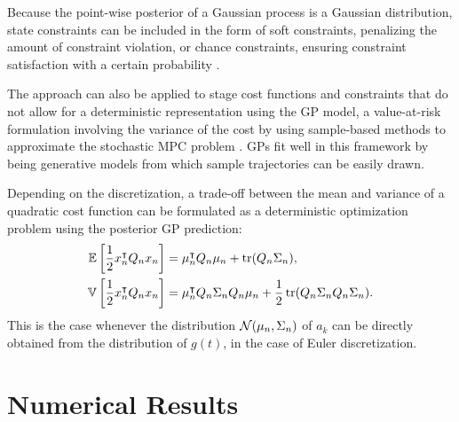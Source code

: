 \begin{remark}
Because the point-wise posterior of a Gaussian process is a Gaussian
distribution, state constraints can be included in the form of soft constraints,
penalizing the amount of constraint violation, or chance constraints, ensuring
constraint satisfaction with a certain probability
%
%
.
\end{remark}

\begin{remark}
The approach can also be applied to stage cost functions and constraints that
do not allow for a deterministic representation using the GP model, \eg a
value-at-risk formulation involving the variance of the cost by using
sample-based methods to approximate the stochastic MPC problem
%
%
.
GPs fit well in this framework by being generative models from which sample
trajectories can be easily drawn.
\end{remark}

\begin{remark}
Depending on the discretization, a trade-off between the mean and variance
of a quadratic cost function can be formulated as a deterministic optimization
problem using the posterior GP prediction:
\begin{subequations}
\begin{align}
  \mathbb{E}\left[ \frac{1}{2} x_n^{\intercal} Q_n x_n\right] &= \mu_n^{\intercal} Q_n \mu_n +
  \operatorname*{tr}(Q_n\Sigma_n),\\
  \mathbb{V}\left[ \frac{1}{2} x_n^{\intercal} Q_n x_n\right] &= \mu_n^{\intercal} Q_n
\Sigma_n Q_n
  \mu_n + \frac{1}{2} \operatorname*{tr}(Q_n\Sigma_n Q_n\Sigma_n).
\end{align}
\end{subequations}
This is the case whenever the distribution $\mathcal{N}(\mu_n,\Sigma_n)$ of $a_k$ can be
directly obtained from the distribution of $g(t)$, \eg in the case of Euler
discretization.
\end{remark}

\section{Numerical Results}
\label{sec:gp-pec-experiments}

